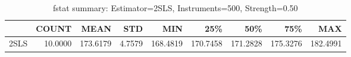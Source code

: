 \begin{table}[ht]
\centering
\caption{fstat summary: Estimator=2SLS, Instruments=500, Strength=0.50}
\begin{tabular}{lrrrrrrrr}
\toprule
 & COUNT & MEAN & STD & MIN & 25\% & 50\% & 75\% & MAX \\
\midrule
2SLS & 10.0000 & 173.6179 & 4.7579 & 168.4819 & 170.7458 & 171.2828 & 175.3276 & 182.4991 \\
\bottomrule
\end{tabular}
\end{table}
